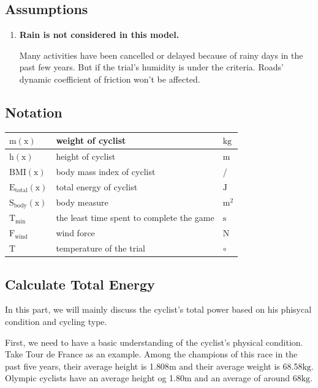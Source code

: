 \documentclass[14pt]{article}
\begin{document}
	\subsection{Assumptions}
	\begin{enumerate}
		\item	\textbf{Rain is not considered in this model.}

				Many activities have been cancelled or delayed because of rainy days in the past few years. But if the trial's humidity is under the criteria. Roads' dynamic coefficient of friction won't be affected.
	\end{enumerate}
	\subsection{Notation}
	\begin{tabular}{|l|l|l|}
		\hline
		$\mathrm{m}(\mathrm{x})$&weight of cyclist&$\mathrm{kg}$\\
		\hline
		$\mathrm{h}(\mathrm{x})$&height of cyclist&$\mathrm{m}$\\
		\hline
		$\mathrm{BMI}(\mathrm{x})$&body mass index of cyclist&/\\
		\hline
		$\mathrm{E}_\mathrm{total} (\mathrm{x})$&total energy of cyclist&$\mathrm{J}$\\
		\hline
		$\mathrm{S}_\mathrm{body}(\mathrm{x})$&body measure&$\mathrm{m}^2$\\
		\hline
		$\mathrm{T}_\mathrm{min}$&the least time spent to complete the game&$\mathrm{s}$\\
		\hline
		$\mathrm{F}_\mathrm{wind}$&wind force&$\mathrm{N}$\\
		\hline
		$\mathrm{T}$&temperature of the trial&$\circ$\\
		\hline
	\end{tabular}
	\subsection{Calculate Total Energy}
	In this part, we will mainly discuss the cyclist's total power based on his phisycal condition and cycling type. 

	First, we need to have a basic understanding of the cyclist's physical condition. Take Tour de France as an example\cite{france}. Among the champions of this race in the past five years, their average height is 1.808$\mathrm{m}$ and their average weight is 68.58$\mathrm{kg}$. Olympic cyclists have an average height og 1.80$\mathrm{m}$ and an average of around 68$\mathrm{kg}$\cite{weight}. 
\end{document}
